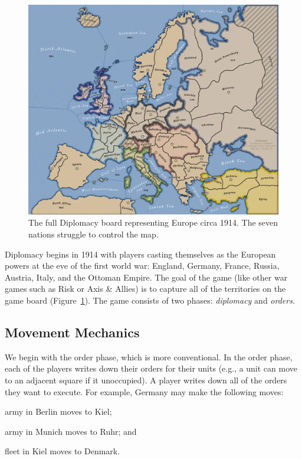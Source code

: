 \documentclass[11pt,letterpaper]{article}
\begin{document}
\begin{figure}
  \begin{center}
  \includegraphics[width=\linewidth]{figures/full_map}
  \end{center}
  \caption{The full Diplomacy board representing Europe circa 1914.
    The seven nations struggle to control the map.}
  \label{fig:board}
\end{figure}

Diplomacy begins in 1914 with players casting themselves as the
European powers at the eve of the first world war: England, Germany,
France, Russia, Austria, Italy, and the Ottoman Empire.  The goal of
the game (like other war games such as Risk or Axis \& Allies) is to
capture all of the territories on the game board
(Figure~\ref{fig:board}).  The game consists of two
phases: \emph{diplomacy} and \emph{orders}.

\subsection{Movement Mechanics}
\label{sec:mechanics}

We begin with the order phase, which is more conventional.  In the
order phase, each of the players writes down their orders for their
units (e.g., a unit can move to an adjacent square if it unoccupied).
A player writes down all of the orders they want to execute.  For
example, Germany may make the following moves:
\begin{itemize*}
        \item army in Berlin moves to Kiel;
        \item army in Munich moves to Ruhr; and
        \item fleet in Kiel moves to Denmark.
\end{itemize*}
\end{document}
